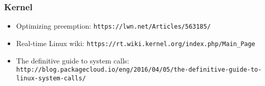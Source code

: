 \begin{frame}[fragile]
  \frametitle{Kernel}

  \begin{itemize}
  \item Optimizing preemption: \verb+https://lwn.net/Articles/563185/+
  \item Real-time Linux wiki: \verb+https://rt.wiki.kernel.org/index.php/Main_Page+
    \item The definitive guide to system calls: \tiny\verb+http://blog.packagecloud.io/eng/2016/04/05/the-definitive-guide-to-linux-system-calls/+
  \end{itemize}
\end{frame}
